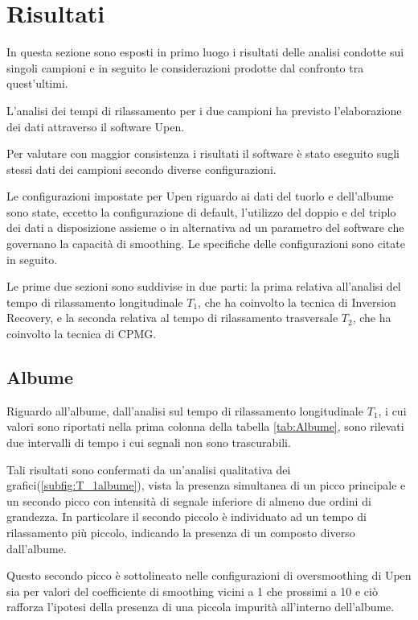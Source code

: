 \section*{Risultati}
In questa sezione sono esposti in primo luogo i risultati delle analisi condotte sui singoli campioni e in seguito le considerazioni prodotte dal confronto tra quest'ultimi. 

L'analisi dei tempi di rilassamento per i due campioni ha previsto l'elaborazione dei dati attraverso il software Upen.

Per valutare con maggior consistenza i risultati il software è stato eseguito sugli stessi dati dei campioni secondo diverse configurazioni.

Le configurazioni impostate per Upen riguardo ai dati del tuorlo e dell'albume sono state, eccetto la configurazione di default, l'utilizzo del doppio e del triplo dei dati a disposizione assieme o in alternativa ad un parametro del software che governano la capacità di smoothing. 
Le specifiche delle configurazioni sono citate in seguito. 

Le prime due sezioni sono suddivise in due parti: la prima relativa all'analisi del tempo di rilassamento longitudinale $T_1$, che ha coinvolto la tecnica di Inversion Recovery, e la seconda relativa al tempo di rilassamento trasversale $T_2$, che ha coinvolto la tecnica di CPMG. 



\subsection*{Albume} 

Riguardo all'albume, dall'analisi sul tempo di rilassamento longitudinale $T_1$, i cui valori sono riportati nella prima colonna della tabella \ref{tab:Albume}, sono rilevati due intervalli di tempo i cui segnali non sono trascurabili. 

Tali risultati sono confermati da un'analisi qualitativa dei grafici(\ref{subfig:T_1albume}), vista la presenza simultanea di un picco principale e un secondo picco con intensità di segnale inferiore di almeno due ordini di grandezza. 
In particolare il secondo piccolo è individuato ad un tempo di rilassamento più piccolo, indicando la presenza di un composto diverso dall'albume.

Questo secondo picco è sottolineato nelle configurazioni di oversmoothing di Upen sia per valori del coefficiente di smoothing vicini a 1 che prossimi a 10 e ciò rafforza l'ipotesi della presenza di una piccola impurità all'interno dell'albume. 

